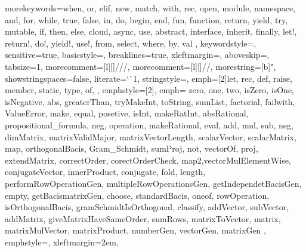 




%
{
  morekeywords={when, or, elif, new, match, with, rec, open, module, namespace, %
    and, for, while, true, false, in, do, begin, end, fun, function, return, yield, try, %
    mutable, if, then, else, cloud, async, use, abstract, interface, inherit, finally,
    let!, return!, do!, yield!, use!, from, select, where, by, val },
  keywordstyle=\color{codepurple},
  sensitive=true,
  basicstyle=\ttfamily\small,
  breaklines=true,
  xleftmargin=\parindent,
  aboveskip=\bigskipamount,
  tabsize=1,
  morecomment=[l][\color{greencomments}]{///},
  morecomment=[l][\color{greencomments}]{//},
  morestring=[b]",
  showstringspaces=false,
  literate={`}{\`}1,
  stringstyle=\color{greencomments},
  emph={[2]let, rec, def, raise, member, static, type, of, }, %
  emphstyle={[2]\color{bluekeywords}},
  emph={
    zero, one, two, isZero, isOne, isNegative, abs, greaterThan, tryMakeInt, toString, sumList, factorial, failwith, ValueError, make, equal, posetive, isInt, makeRatInt, absRational, propositional_formula, neg, operation, makeRational, eval, add, mul, sub, neg, dimMatrix, matrixValidMajor, matrixVectorLength, scalarVector, scalarMatrix, map, orthogonalBacis, Gram_Schmidt, sumProj, not, vectorOf, proj, extendMatrix, correctOrder, corectOrderCheck, map2,vectorMulElementWise, conjugateVector, innerProduct, conjugate, fold, length, performRowOperationGen, multipleRowOperationsGen, getIndependetBacisGen, empty, getBacismatrixGen, choose, standardBacis, oneof, rowOperation, isOrthogonalBacis, gramSchmidtIsOrthogonal, classify, addVector, subVector, addMatrix, giveMatrixHaveSameOrder, sumRows, matrixToVector, matrix, matrixMulVector, matrixProduct, numberGen, vectorGen, matrixGen
    }, %
  emphstyle=\color{red},
  xleftmargin=2em,
}




